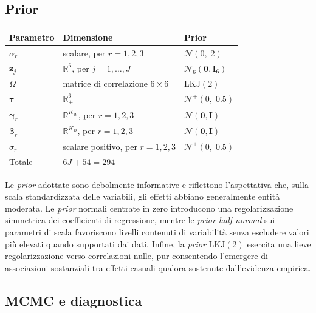 \documentclass[11pt, a4paper]{article}
\newcommand{\Nrm}{\mathcal{N}}
\newcommand{\HN}{\mathcal{N}^{+}}
\begin{document}
\subsection{Prior}

\begin{center}
\begin{tabular}{@{}lll@{}}
\toprule
Parametro & Dimensione & Prior \\
\midrule
$\alpha_r$
& scalare, per $r=1,2,3$
& $\Nrm(0,\;2)$ \\

$\mathbf z_j$
& $\mathbb R^6$, per $j=1,\ldots,J$
& $\Nrm_6(\mathbf 0,\mathbf I_6)$ \\

$\Omega$
& matrice di correlazione $6\times6$
& $\mathrm{LKJ}(2)$ \\

$\boldsymbol{\tau}$
& $\mathbb R^6_{+}$
& $\HN(0,\;0.5)$ \\

$\boldsymbol{\gamma}_r$
& $\mathbb R^{K_W}$, per $r=1,2,3$
& $\Nrm(\mathbf 0,\mathbf I)$ \\

$\boldsymbol{\beta}_r$
& $\mathbb R^{K_B}$, per $r=1,2,3$
& $\Nrm(\mathbf 0,\mathbf I)$ \\

$\sigma_r$
& scalare positivo, per $r=1,2,3$
& $\HN(0,\;0.5)$ \\
\midrule
Totale
& $6J + 54 = 294$
& \\
\bottomrule
\end{tabular}
\end{center}

\medskip

Le \textit{prior} adottate sono debolmente informative e riflettono l'aspettativa che, sulla scala standardizzata delle variabili, gli effetti abbiano generalmente entità moderata. Le \textit{prior} normali centrate in zero introducono una regolarizzazione simmetrica dei coefficienti di regressione, mentre le \textit{prior half-normal} sui parametri di scala favoriscono livelli contenuti di variabilità senza escludere valori più elevati quando supportati dai dati. Infine, la \textit{prior} $\mathrm{LKJ}(2)$ esercita una lieve regolarizzazione verso correlazioni nulle, pur consentendo l'emergere di associazioni sostanziali tra effetti casuali qualora sostenute dall'evidenza empirica.

\subsection{MCMC e diagnostica}
\end{document}
